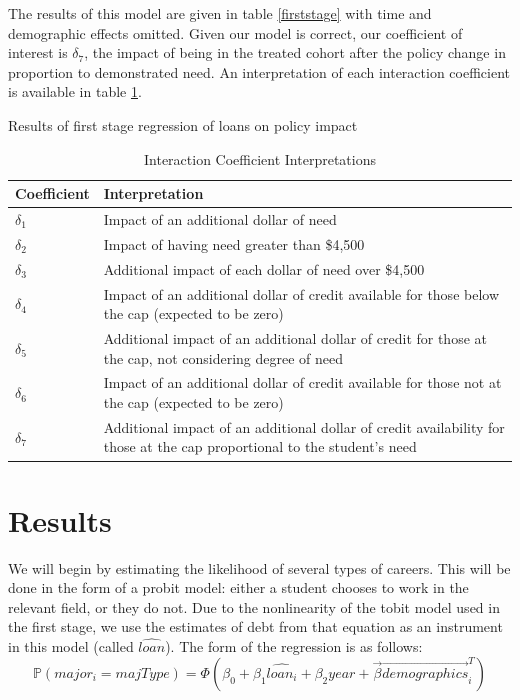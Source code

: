 \documentclass[12pt]{article}
\newcommand{\regs}{../Analysis/Regressions/Output/}
\begin{document}
	 The results of this model are given in table \ref{firststage} with time and demographic effects omitted. Given our model is correct, our coefficient of interest is $\delta_7$, the impact of being in the treated cohort after the policy change in proportion to demonstrated need. An interpretation of each interaction coefficient is available in table \ref{coefInterp}.
	 
	 \begin{table}
	 	\centering
	 	\caption{Results of first stage regression of loans on policy impact}	 
	 	\resizebox{\textwidth}{!}{	
		 	
		 }
	 	\label{firststage}
	 \end{table}
	
	\begin{table}
		\centering
		\caption{Interaction Coefficient Interpretations}		
		\begin{tabular}{lp{8cm}}
			\toprule
			Coefficient & Interpretation\\
			\midrule
			$\delta_1$ & Impact of an additional dollar of need\\
			$\delta_2$ & Impact of having need greater than \$4,500 \\
			$\delta_3$ & Additional impact of each dollar of need over \$4,500 \\
			$\delta_4$ & Impact of an additional dollar of credit available for those below the cap (expected to be zero)\\
			$\delta_5$ & Additional impact of an additional dollar of credit for those at the cap, not considering degree of need\\
			$\delta_6$ & Impact of an additional dollar of credit available for those not at the cap (expected to be zero)\\
			$\delta_7$ & Additional impact of an additional dollar of credit availability for those at the cap proportional to the student's need \\
			\bottomrule
		\end{tabular}
	
		\label{coefInterp}
	\end{table}
	
	
	\section{Results}
	
	We will begin by estimating the likelihood of several types of careers. This will be done in the form of a probit model: either a student chooses to work in the relevant field, or they do not. Due to the nonlinearity of the tobit model used in the first stage, we use the estimates of debt from that equation as an instrument in this model (called $\hat{loan}$). The form of the regression is as follows: 
	\begin{equation}
	\mathbb{P}\left(major_i = majType\right) = \Phi\left(\beta_0 + \beta_1 \hat{loan_i} + \beta_2 year + \vec{\beta}\vec{demographics}^T_i\right)
	\end{equation}
	
\end{document}
